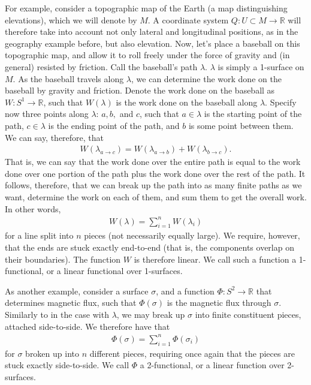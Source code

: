 \documentclass{book}
\begin{document}
For example, consider a topographic map of the Earth (a map distinguishing elevations), which we will denote by $M$. A coordinate system $Q: U \subset M \to \mathbb{R}$ will therefore take into account not only lateral and longitudinal positions, as in the geography example before, but also elevation. Now, let's place a baseball on this topographic map, and allow it to roll freely under the force of gravity and (in general) resisted by friction. Call the baseball's path $\lambda$. $\lambda$ is simply a 1-surface on $M$. As the baseball travels along $\lambda$, we can determine the work done on the baseball by gravity and friction. Denote the work done on the baseball as $W: S^1 \to \mathbb{R}$, such that $W(\lambda)$ is the work done on the baseball along $\lambda$. Specify now three points along $\lambda$: $a, b,$ and $c$, such that $a \in \lambda$ is the starting point of the path, $c \in \lambda$ is the ending point of the path, and $b$ is some point between them. We can say, therefore, that \begin{gather} W(\lambda_{a\to c}) = W(\lambda_{a \to b}) + W(\lambda_{b \to c}).\end{gather} That is, we can say that the work done over the entire path is equal to the work done over one portion of the path plus the work done over the rest of the path. It follows, therefore, that we can break up the path into as many finite paths as we want, determine the work on each of them, and sum them to get the overall work. In other words, \begin{gather} W(\lambda) = \sum_{i=1}^{n} W(\lambda_i) \end{gather} for a line split into $n$ pieces (not necessarily equally large). We require, however, that the ends are stuck exactly end-to-end (that is, the components overlap on their boundaries). The function $W$ is therefore linear. We call such a function a 1-functional, or a linear functional over 1-surfaces. 

As another example, consider a surface $\sigma$, and a function $\Phi: S^2 \to \mathbb{R}$ that determines magnetic flux, such that $\Phi(\sigma)$ is the magnetic flux through $\sigma$. Similarly to in the case with $\lambda$, we may break up $\sigma$ into finite constituent pieces, attached side-to-side. We therefore have that \begin{gather} \Phi(\sigma) = \sum_{i=1}^n \Phi(\sigma_i) \end{gather} for $\sigma$ broken up into $n$ different pieces, requiring once again that the pieces are stuck exactly side-to-side. We call $\Phi$ a 2-functional, or a linear function over 2-surfaces. 
\end{document}
